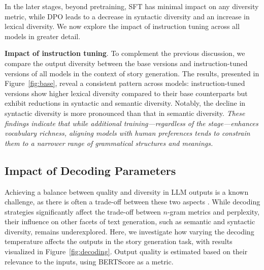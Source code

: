 \documentclass[11pt,a4paper]{article}
\begin{document}
In the later stages, beyond pretraining, SFT has minimal impact on any diversity metric, while DPO leads to a decrease in syntactic diversity and an increase in lexical diversity. We now explore the impact of instruction tuning across all models in greater detail.





\smallskip
\noindent\textbf{Impact of instruction tuning}.
To complement the previous discussion, we compare the output diversity between the base versions and instruction-tuned versions of all models in the context of story generation. The results, presented in Figure~\ref{fig:base}, reveal a consistent pattern across models: instruction-tuned versions show higher lexical diversity compared to their base counterparts but exhibit reductions in syntactic and semantic diversity. Notably, the decline in syntactic diversity is more pronounced than that in semantic diversity. 
\textit{These findings indicate that while additional training—regardless of the stage—enhances vocabulary richness, aligning models with human preferences tends to constrain them to a narrower range of grammatical structures and meanings.}

\subsection{Impact of Decoding Parameters}\label{sec:decoding}

Achieving a balance between quality and diversity in LLM outputs is a known challenge, as there is often a trade-off between these two aspects
\citep{Caccia2020Language,zhang-etal-2021-trading}. While decoding strategies significantly affect the trade-off between $n$-gram metrics and perplexity, their influence on other facets of text generation, such as semantic and syntactic diversity, remains underexplored. Here, we investigate how varying the decoding temperature affects the outputs in the story generation task, with results visualized in Figure~\ref{fig:decoding}. Output quality is estimated based on their relevance to the inputs, using BERTScore as a metric.
\end{document}
